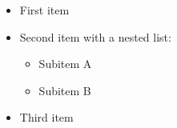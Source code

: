 \begin{itemize}
  \item First item
  \item Second item with a nested list:
    \begin{itemize}
      \item Subitem A
      \item Subitem B
    \end{itemize}
  \item Third item
\end{itemize}